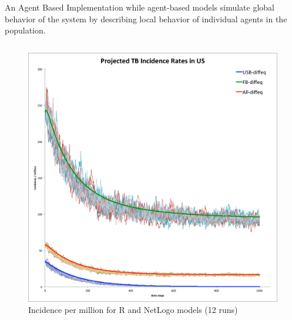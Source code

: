 \documentclass[final]{beamer}
\begin{document}
\begin{frame}
\begin{columns}
\begin{column}{.3\textwidth}
\begin{block}{An Agent Based Implementation}
        while agent-based models simulate global behavior of the system by
        describing local behavior of individual agents in the population.
        \begin{block}{}
          \begin{column}{.45\textwidth}
            \begin{figure}[h]
              \begin{center}
                \includegraphics[width=\textwidth]{NLHMinc}
              \end{center}
              \caption{Incidence per million for R and NetLogo models (12 runs)}
              \label{fig:NLHMinc}
            \end{figure}
          \end{column}
          \begin{column}{.45\textwidth}
            \begin{figure}[h]
              \begin{center}

\end{center}
\end{figure}
\end{column}
\end{block}
\end{block}
\end{column}
\end{columns}
\end{frame}
\end{document}
